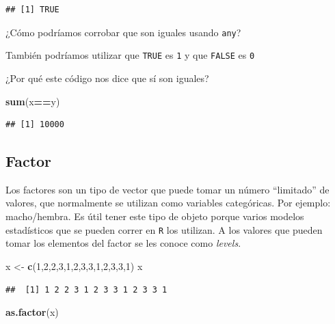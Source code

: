 \documentclass[
]{book}
\newenvironment{Shaded}{\begin{snugshade}}{\end{snugshade}}
\newcommand{\DecValTok}[1]{\textcolor[rgb]{0.00,0.00,0.81}{#1}}
\newcommand{\FunctionTok}[1]{\textcolor[rgb]{0.13,0.29,0.53}{\textbf{#1}}}
\newcommand{\NormalTok}[1]{#1}
\newcommand{\OtherTok}[1]{\textcolor[rgb]{0.56,0.35,0.01}{#1}}
\newcommand{\SpecialCharTok}[1]{\textcolor[rgb]{0.81,0.36,0.00}{\textbf{#1}}}
\begin{document}
\begin{verbatim}
## [1] TRUE
\end{verbatim}

¿Cómo podríamos corrobar que son iguales usando \texttt{any}?

También podríamos utilizar que \texttt{TRUE} es \texttt{1} y que \texttt{FALSE} es \texttt{0}

¿Por qué este código nos dice que sí son iguales?

\begin{Shaded}
\begin{Highlighting}[]
\FunctionTok{sum}\NormalTok{(x}\SpecialCharTok{==}\NormalTok{y)}
\end{Highlighting}
\end{Shaded}

\begin{verbatim}
## [1] 10000
\end{verbatim}

\subsection{Factor}\label{factor}

Los factores son un tipo de vector que puede tomar un número ``limitado'' de valores, que normalmente se utilizan como variables categóricas. Por ejemplo: macho/hembra. Es útil tener este tipo de objeto porque varios modelos estadísticos que se pueden correr en \texttt{R} los utilizan. A los valores que pueden tomar los elementos del factor se les conoce como \emph{levels}.

\begin{Shaded}
\begin{Highlighting}[]
\NormalTok{x }\OtherTok{\textless{}{-}} \FunctionTok{c}\NormalTok{(}\DecValTok{1}\NormalTok{,}\DecValTok{2}\NormalTok{,}\DecValTok{2}\NormalTok{,}\DecValTok{3}\NormalTok{,}\DecValTok{1}\NormalTok{,}\DecValTok{2}\NormalTok{,}\DecValTok{3}\NormalTok{,}\DecValTok{3}\NormalTok{,}\DecValTok{1}\NormalTok{,}\DecValTok{2}\NormalTok{,}\DecValTok{3}\NormalTok{,}\DecValTok{3}\NormalTok{,}\DecValTok{1}\NormalTok{)}
\NormalTok{x}
\end{Highlighting}
\end{Shaded}

\begin{verbatim}
##  [1] 1 2 2 3 1 2 3 3 1 2 3 3 1
\end{verbatim}

\begin{Shaded}
\begin{Highlighting}[]
\FunctionTok{as.factor}\NormalTok{(x)}
\end{Highlighting}
\end{Shaded}
\end{document}
